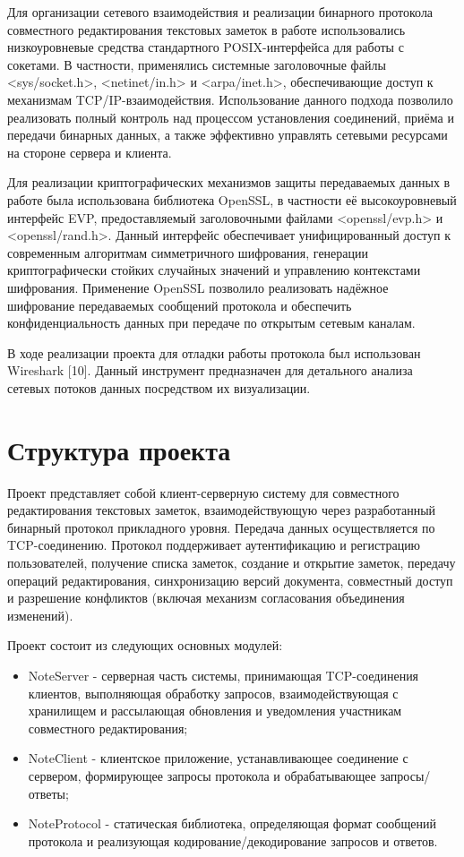 Для организации сетевого взаимодействия и реализации бинарного протокола совместного редактирования текстовых заметок в работе использовались низкоуровневые средства стандартного POSIX-интерфейса для работы с сокетами. В частности, применялись системные заголовочные файлы <sys/socket.h>, <netinet/in.h> и <arpa/inet.h>, обеспечивающие доступ к механизмам TCP/IP-взаимодействия. Использование данного подхода позволило реализовать полный контроль над процессом установления соединений, приёма и передачи бинарных данных, а также эффективно управлять сетевыми ресурсами на стороне сервера и клиента.

Для реализации криптографических механизмов защиты передаваемых данных в работе была использована библиотека OpenSSL, в частности её высокоуровневый интерфейс EVP, предоставляемый заголовочными файлами <openssl/evp.h> и <openssl/rand.h>. Данный интерфейс обеспечивает унифицированный доступ к современным алгоритмам симметричного шифрования, генерации криптографически стойких случайных значений и управлению контекстами шифрования. Применение OpenSSL позволило реализовать надёжное шифрование передаваемых сообщений протокола и обеспечить конфиденциальность данных при передаче по открытым сетевым каналам.

В ходе реализации проекта для отладки работы протокола был использован Wireshark [10]. Данный инструмент предназначен для детального анализа сетевых потоков данных посредством их визуализации.

\section{Структура проекта}

Проект представляет собой клиент-серверную систему для совместного редактирования текстовых заметок, взаимодействующую через разработанный бинарный протокол прикладного уровня. Передача данных осуществляется по TCP-соединению. Протокол поддерживает аутентификацию и регистрацию пользователей, получение списка заметок, создание и открытие заметок, передачу операций редактирования, синхронизацию версий документа, совместный доступ и разрешение конфликтов (включая механизм согласования объединения изменений).

Проект состоит из следующих основных модулей:

\begin{itemize}
    \item NoteServer - серверная часть системы, принимающая TCP-соединения клиентов, выполняющая обработку запросов, взаимодействующая с хранилищем и рассылающая обновления и уведомления участникам совместного редактирования;
    \item NoteClient - клиентское приложение, устанавливающее соединение с сервером, формирующее запросы протокола и обрабатывающее запросы/ответы;
    \item NoteProtocol - статическая библиотека, определяющая формат сообщений протокола и реализующая кодирование/декодирование запросов и ответов.
\end{itemize}

